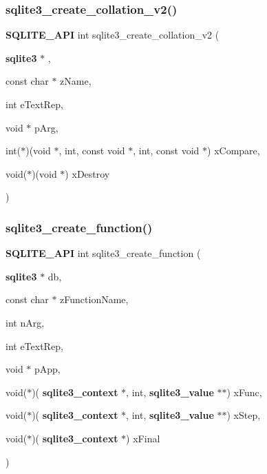 \mbox{\label{sqlite3_8h_acf133d2ce646b13fd95ca84940e34102}} 
\subsubsection{sqlite3\_create\_collation\_v2()}
{\footnotesize\ttfamily \textbf{ S\+Q\+L\+I\+T\+E\+\_\+\+A\+PI} int sqlite3\+\_\+create\+\_\+collation\+\_\+v2 (\begin{DoxyParamCaption}\item[{\textbf{ sqlite3} $\ast$}]{,  }\item[{const char $\ast$}]{z\+Name,  }\item[{int}]{e\+Text\+Rep,  }\item[{void $\ast$}]{p\+Arg,  }\item[{int($\ast$)(void $\ast$, int, const void $\ast$, int, const void $\ast$)}]{x\+Compare,  }\item[{void($\ast$)(void $\ast$)}]{x\+Destroy }\end{DoxyParamCaption})}

\mbox{\label{sqlite3_8h_a4532ad3e2f9ee8707fe66d8b7065ad0f}} 
\subsubsection{sqlite3\_create\_function()}
{\footnotesize\ttfamily \textbf{ S\+Q\+L\+I\+T\+E\+\_\+\+A\+PI} int sqlite3\+\_\+create\+\_\+function (\begin{DoxyParamCaption}\item[{\textbf{ sqlite3} $\ast$}]{db,  }\item[{const char $\ast$}]{z\+Function\+Name,  }\item[{int}]{n\+Arg,  }\item[{int}]{e\+Text\+Rep,  }\item[{void $\ast$}]{p\+App,  }\item[{void($\ast$)(\textbf{ sqlite3\+\_\+context} $\ast$, int, \textbf{ sqlite3\+\_\+value} $\ast$$\ast$)}]{x\+Func,  }\item[{void($\ast$)(\textbf{ sqlite3\+\_\+context} $\ast$, int, \textbf{ sqlite3\+\_\+value} $\ast$$\ast$)}]{x\+Step,  }\item[{void($\ast$)(\textbf{ sqlite3\+\_\+context} $\ast$)}]{x\+Final }\end{DoxyParamCaption})}

